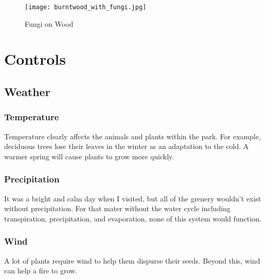 \documentclass{article}
\begin{document}
\begin{figure}[H]
\centering{}
\caption{Fungi on Wood}
\texttt{[image: burntwood\_with\_fungi.jpg]}
\label{fungi}
\end{figure}
\newpage

\section{Controls}
\subsection{Weather}
\subsubsection{Temperature}\label{ssub:temperature}
Temperature clearly affects the animals and plants within the park. For example, 
deciduous trees lose their leaves in the winter as an adaptation to the cold. A warmer
spring will cause plants to grow more quickly. 

\subsubsection{Precipitation}\label{ssub:temperature_label_ssub_temperature}
It was a bright and calm day when I visited, but all of the grenery wouldn't exist without
precipitation. For that mater without the water cycle including transpiration, precipitation, and evaporation, none of this system would function.

\subsubsection{Wind}\label{ssub:temperature_label_ssub_temperature}
A lot of plants require wind to help them dispurse their seeds. Beyond this, wind can
help a fire to grow. 
\end{document}
